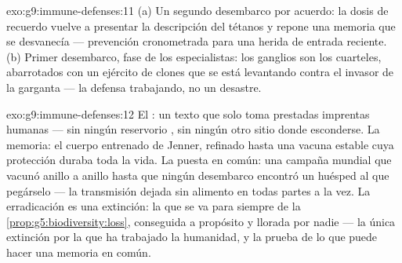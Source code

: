 \begin{solution}{exo:g9:immune-defenses:11}
(a) Un segundo desembarco por acuerdo: la dosis de recuerdo vuelve a
presentar la descripción del tétanos y repone una memoria que se
desvanecía --- prevención cronometrada para una herida de entrada
reciente. (b) Primer desembarco, fase de los especialistas: los
ganglios son los cuarteles, abarrotados con un ejército de clones que
se está levantando contra el invasor de la garganta --- la defensa
trabajando, no un desastre.
\end{solution}

\begin{solution}{exo:g9:immune-defenses:12}
El : un texto que solo toma prestadas imprentas humanas --- sin
ningún reservorio , sin ningún otro sitio donde esconderse. La
memoria: el cuerpo entrenado de Jenner, refinado hasta una vacuna
estable cuya protección duraba toda la vida. La puesta en común: una
campaña mundial que vacunó anillo a anillo hasta que ningún desembarco
encontró un huésped al que pegárselo --- la transmisión dejada sin
alimento en todas partes a la vez. La erradicación es una extinción:
la  que se va para siempre de la
\cref{prop:g5:biodiversity:loss}, conseguida a propósito y llorada por
nadie --- la única extinción por la que ha trabajado la humanidad, y la
prueba de lo que puede hacer una memoria en común.
\end{solution}

